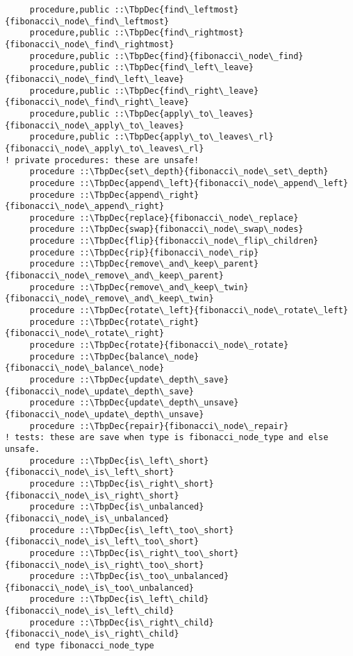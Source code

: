 \begin{Verbatim}
     procedure,public ::\TbpDec{find\_leftmost}{fibonacci\_node\_find\_leftmost}
     procedure,public ::\TbpDec{find\_rightmost}{fibonacci\_node\_find\_rightmost}
     procedure,public ::\TbpDec{find}{fibonacci\_node\_find}
     procedure,public ::\TbpDec{find\_left\_leave}{fibonacci\_node\_find\_left\_leave}
     procedure,public ::\TbpDec{find\_right\_leave}{fibonacci\_node\_find\_right\_leave}
     procedure,public ::\TbpDec{apply\_to\_leaves}{fibonacci\_node\_apply\_to\_leaves}
     procedure,public ::\TbpDec{apply\_to\_leaves\_rl}{fibonacci\_node\_apply\_to\_leaves\_rl}
! private procedures: these are unsafe!
     procedure ::\TbpDec{set\_depth}{fibonacci\_node\_set\_depth}
     procedure ::\TbpDec{append\_left}{fibonacci\_node\_append\_left}
     procedure ::\TbpDec{append\_right}{fibonacci\_node\_append\_right}
     procedure ::\TbpDec{replace}{fibonacci\_node\_replace}
     procedure ::\TbpDec{swap}{fibonacci\_node\_swap\_nodes}
     procedure ::\TbpDec{flip}{fibonacci\_node\_flip\_children}
     procedure ::\TbpDec{rip}{fibonacci\_node\_rip}
     procedure ::\TbpDec{remove\_and\_keep\_parent}{fibonacci\_node\_remove\_and\_keep\_parent}
     procedure ::\TbpDec{remove\_and\_keep\_twin}{fibonacci\_node\_remove\_and\_keep\_twin}
     procedure ::\TbpDec{rotate\_left}{fibonacci\_node\_rotate\_left}
     procedure ::\TbpDec{rotate\_right}{fibonacci\_node\_rotate\_right}
     procedure ::\TbpDec{rotate}{fibonacci\_node\_rotate}
     procedure ::\TbpDec{balance\_node}{fibonacci\_node\_balance\_node}
     procedure ::\TbpDec{update\_depth\_save}{fibonacci\_node\_update\_depth\_save}
     procedure ::\TbpDec{update\_depth\_unsave}{fibonacci\_node\_update\_depth\_unsave}
     procedure ::\TbpDec{repair}{fibonacci\_node\_repair}
! tests: these are save when type is fibonacci_node_type and else unsafe.
     procedure ::\TbpDec{is\_left\_short}{fibonacci\_node\_is\_left\_short}
     procedure ::\TbpDec{is\_right\_short}{fibonacci\_node\_is\_right\_short}
     procedure ::\TbpDec{is\_unbalanced}{fibonacci\_node\_is\_unbalanced}
     procedure ::\TbpDec{is\_left\_too\_short}{fibonacci\_node\_is\_left\_too\_short}
     procedure ::\TbpDec{is\_right\_too\_short}{fibonacci\_node\_is\_right\_too\_short}
     procedure ::\TbpDec{is\_too\_unbalanced}{fibonacci\_node\_is\_too\_unbalanced}
     procedure ::\TbpDec{is\_left\_child}{fibonacci\_node\_is\_left\_child}
     procedure ::\TbpDec{is\_right\_child}{fibonacci\_node\_is\_right\_child}
  end type fibonacci_node_type
\end{Verbatim}
